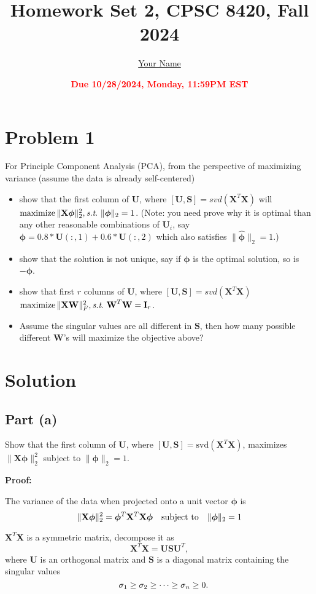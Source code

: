 \documentclass[11pt]{article}
\title{{\bf Homework Set 2, CPSC 8420, Fall 2024}} %
\author{\Large\underline{Your Name}}
\date{\textbf{\Large\textcolor{red}{Due 10/28/2024, Monday, 11:59PM EST}}} %
\newcommand{\maximize}{\operatorname*{maximize}}
\newcommand{\mtx}[1]{\mathbf{#1}}
\def \mI {\mtx{I}}
\def \mU {\mtx{U}}
\def \mS {\mtx{S}}
\def \mW {\mtx{W}}
\def \mX {\mtx{X}}
\begin{document}
	\maketitle
	

	\section*{Problem 1}
	For Principle Component Analysis (PCA), from the perspective of maximizing variance (assume the data is already self-centered)
	\begin{itemize}
		\item show that the first column of $\mU$, where $[\mU,\mS]=svd(\mX^T\mX)$ will $\maximize \|\mX \bm{\phi}\|^2_2, \st \ \|\bm{\phi}\|_2=1$. (Note: you need prove why it is optimal than any other reasonable combinations of $\mU_i$, say $\hat{\bm{\phi}}=0.8*\mU(:,1)+0.6*\mU(:,2)$ which also  satisfies $\|\hat{\bm{\phi}}\|_2=1$.) 
		\item show that the solution is not unique, say if $\bm{\phi}$ is the optimal solution, so is $-\bm{\phi}$. 
		\item show that first $r$  columns of $\mU$, where $[\mU,\mS]=svd(\mX^T\mX)$ $\maximize \|\mX \bm{\mW}\|^2_F, \st \ \bm{\mW}^T\bm{\mW}=\mI_r$.
		\item Assume the singular values are all different in $\mS$, then how many possible different $\mW$'s will maximize the objective above?
	\end{itemize} 
	
	\section*{Solution}

\subsection*{Part (a)}
Show that the first column of $\mU$, where $[\mU, \mS] = \text{svd}(\mX^T \mX)$, maximizes $\|\mX \bm{\phi}\|_2^2$ subject to $\|\bm{\phi}\|_2 = 1$.

\textbf{Proof:}

The variance of the data when projected onto a unit vector $\bm{\phi}$ is
	\[
	\|\mX \bm{\phi}\|_2^2 = \bm{\phi}^T \mX^T \mX \bm{\phi} \hspace*{10pt} \text{subject to} \hspace*{10pt}\|\bm{\phi}\|_2 = 1
	\]


$\mX^T \mX$ is a symmetric matrix, decompose it as
   \[
   \mX^T \mX = \mU \mS \mU^T,
   \]
   \hspace*{15pt}where $\mU$ is an orthogonal matrix and $\mS$ is a diagonal matrix containing the singular values
   \[
   \hspace*{10pt}\sigma_1 \geq \sigma_2 \geq \dots \geq \sigma_n \geq 0.
   \]
   
\end{document}
